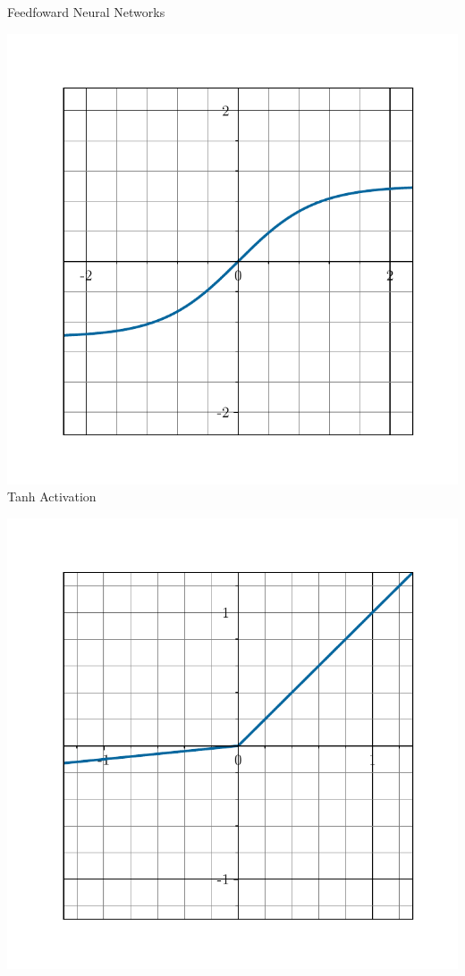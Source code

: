 \begin{frame}{Feedfoward Neural Networks}
\begin{overlayarea}{\textwidth}{4cm}
{\begin{minipage}{\textwidth}
\begin{minipage}{0.32\textwidth}
	  \includegraphics[scale=0.15]{images/nonlinear_func/tanh.pdf} \\
	  \tiny{Tanh Activation}
	\end{minipage}
	\hfill
	\begin{minipage}{0.31\textwidth}
	  \centering
	  \includegraphics[scale=0.15]{images/nonlinear_func/relu.pdf} \\

\end{minipage}
\end{minipage}}
\end{overlayarea}
\end{frame}
